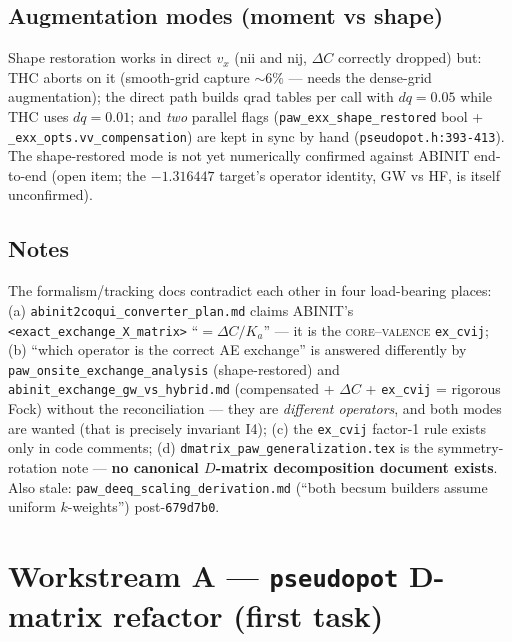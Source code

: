 \documentclass[11pt]{article}
\newcommand{\code}[1]{\texttt{\small #1}}
\newcommand{\file}[1]{\texttt{\small #1}}
\begin{document}
\subsection{Augmentation modes (moment vs shape)}

\begin{description}[leftmargin=2.6em,style=nextline]
\item[F12.] Shape restoration works in direct $v_x$ (nii and nij, $\Delta C$
correctly dropped) but: THC aborts on it (smooth-grid capture ${\sim}6\%$ ---
needs the dense-grid augmentation); the direct path builds qrad tables per
call with $dq{=}0.05$ while THC uses $dq{=}0.01$; and \emph{two} parallel
flags (\code{paw\_exx\_shape\_restored} bool +
\code{\_exx\_opts.vv\_compensation}) are kept in sync by hand
(\file{pseudopot.h:393-413}). The shape-restored mode is not yet numerically
confirmed against ABINIT end-to-end (open item; the $-1.316447$ target's
operator identity, GW vs HF, is itself unconfirmed).
\end{description}

\subsection{Notes}

\begin{description}[leftmargin=2.6em,style=nextline]
\item[F13.] The formalism/tracking docs contradict each other in four
load-bearing places:
(a) \file{abinit2coqui\_converter\_plan.md} claims ABINIT's
\code{<exact\_exchange\_X\_matrix>} ``$= \Delta C / K_a$'' --- it is the
\textsc{core--valence} \code{ex\_cvij};
(b) ``which operator is the correct AE exchange'' is answered differently by
\file{paw\_onsite\_exchange\_analysis} (shape-restored) and
\file{abinit\_exchange\_gw\_vs\_hybrid.md} (compensated + $\Delta C$ +
\code{ex\_cvij} = rigorous Fock) without the reconciliation --- they are
\emph{different operators}, and both modes are wanted (that is precisely
invariant I4);
(c) the \code{ex\_cvij} factor-1 rule exists only in code comments;
(d) \file{dmatrix\_paw\_generalization.tex} is the symmetry-rotation note ---
\textbf{no canonical $D$-matrix decomposition document exists}.
Also stale: \file{paw\_deeq\_scaling\_derivation.md} (``both becsum builders
assume uniform $k$-weights'') post-\code{679d7b0}.
\end{description}

\section{Workstream A --- \code{pseudopot} D-matrix refactor (first task)}
\label{sec:wsA}
\end{document}
